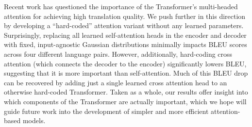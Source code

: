 Recent work has questioned the importance of the Transformer's multi-headed attention for achieving high translation quality. We push further in this direction by developing a ``hard-coded'' attention variant without any learned parameters. Surprisingly, replacing all learned self-attention heads in the encoder and decoder with fixed, input-agnostic Gaussian distributions minimally impacts BLEU scores across four different language pairs. However, additionally, hard-coding cross attention (which connects the decoder to the encoder) significantly lowers BLEU, suggesting that it is more important than self-attention. Much of this  BLEU drop can be recovered by adding just a single learned cross attention head to an otherwise hard-coded Transformer. Taken as a whole, our results offer insight into which components of the Transformer are actually important, which we hope will guide future work into the development of simpler and more efficient attention-based models.
